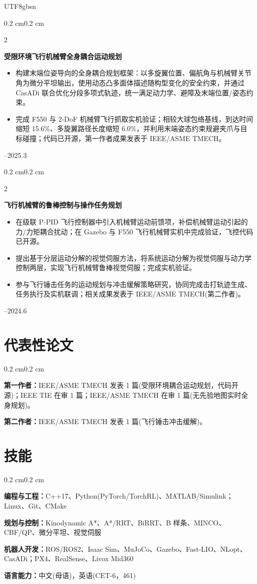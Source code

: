 \documentclass[10pt, letterpaper]{article}
\newenvironment{highlights}{
  \begin{itemize}[
    topsep=0.02 cm,
    parsep=0pt,
    partopsep=0pt,
    itemsep=0pt,
    leftmargin=0.4 cm + 8pt
  ]
}{
  \end{itemize}
}
\newenvironment{onecolentry}{
  \begin{adjustwidth}{0.2 cm}{0.2 cm}
}{
  \end{adjustwidth}
}
\newenvironment{twocolentry}[2][]{
  \onecolentry
  \def\secondColumn{#2}
  \setcolumnwidth{\fill, 3.5 cm}
  \begin{paracol}{2}
}{
  \switchcolumn\raggedleft\secondColumn
  \end{paracol}
  \endonecolentry
}
\begin{document}
\begin{CJK*}{UTF8}{gbsn}
\begin{twocolentry}{2024.6--2025.3}
  \textbf{受限环境飞行机械臂全身耦合运动规划}
  \begin{highlights}
    \item 构建末端位姿导向的全身耦合规划框架：以多旋翼位置、偏航角与机械臂关节角为微分平坦输出，使用动态凸多面体描述随构型变化的安全约束，并通过 CasADi 联合优化分段多项式轨迹，统一满足动力学、避障及末端位置/姿态约束。
    \item 完成 F550 与 2-DoF 机械臂飞行抓取实机验证；相较大球包络基线，到达时间缩短 15.6\%、多旋翼路径长度缩短 6.0\%，并利用末端姿态约束规避夹爪与目标碰撞；代码已开源，第一作者成果发表于 IEEE/ASME TMECH。
  \end{highlights}
\end{twocolentry}

\begin{twocolentry}{2022.3--2024.6}
  \textbf{飞行机械臂的鲁棒控制与操作任务规划}
  \begin{highlights}
    \item 在级联 P-PID 飞行控制器中引入机械臂运动前馈项，补偿机械臂运动引起的力/力矩耦合扰动；在 Gazebo 与 F550 飞行机械臂实机中完成验证，飞控代码已开源。
    \item 提出基于分层运动分解的视觉伺服方法，将系统运动分解为视觉伺服与动力学控制两层，实现飞行机械臂鲁棒视觉伺服；完成实机验证。
    \item 参与飞行锤击任务的运动规划与冲击缓解策略研究，协同完成击打轨迹生成、任务执行及实机联调；相关成果发表于 IEEE/ASME TMECH(第二作者)。
  \end{highlights}
\end{twocolentry}

\vspace{-0.22 cm}
\section{代表性论文}
\begin{onecolentry}
  \textbf{第一作者：}IEEE/ASME TMECH 发表 1 篇(受限环境耦合运动规划，代码开源)；IEEE TIE 在审 1 篇；IEEE/ASME TMECH 在审 1 篇(无先验地图实时全身规划)。

  \textbf{第二作者：}IEEE/ASME TMECH 发表 1 篇(飞行锤击冲击缓解)。
\end{onecolentry}

\vspace{-0.22 cm}
\section{技能}
\begin{onecolentry}
  \textbf{编程与工程：}C++17、Python(PyTorch/TorchRL)、MATLAB/Simulink；Linux、Git、CMake

  \textbf{规划与控制：}Kinodynamic A*、A*/RRT、BiRRT、B 样条、MINCO、CBF/QP、微分平坦、视觉伺服

  \textbf{机器人开发：}ROS/ROS2、Isaac Sim、MuJoCo、Gazebo、Fast-LIO、NLopt、CasADi；PX4、RealSense、Livox Mid360

  \textbf{语言能力：}中文(母语)，英语(CET-6，461)
\end{onecolentry}

\ifPDFTeX%
  \end{CJK*}
\fi
\end{document}
